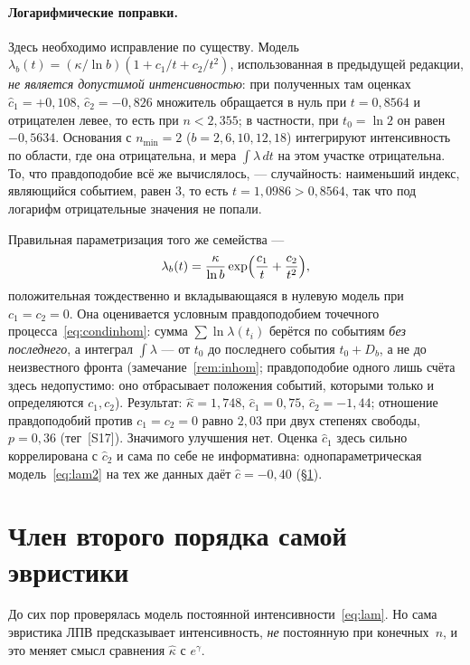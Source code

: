 \documentclass[11pt,a4paper]{article}
\theoremstyle{plain}
\theoremstyle{remark}
\newcommand{\eg}{e^{\gamma}}
\begin{document}
\paragraph{Логарифмические поправки.} Здесь необходимо исправление по существу.
Модель $\lambda_b(t)=(\kappa/\ln b)(1+c_1/t+c_2/t^2)$, использованная в предыдущей
редакции, \emph{не является допустимой интенсивностью}: при полученных там оценках
$\hat c_1=+0{,}108$, $\hat c_2=-0{,}826$ множитель обращается в нуль при
$t=0{,}8564$ и отрицателен левее, то есть при $n<2{,}355$; в частности, при
$t_0=\ln 2$ он равен $-0{,}5634$. Основания с $n_{\min}=2$ ($b=2,6,10,12,18$)
интегрируют интенсивность по области, где она отрицательна, и мера
$\int\lambda\,dt$ на этом участке отрицательна. То, что правдоподобие всё же
вычислялось, --- случайность: наименьший индекс, являющийся событием, равен $3$,
то есть $t=1{,}0986>0{,}8564$, так что под логарифм отрицательные значения не
попали.

Правильная параметризация того же семейства ---
\begin{equation}\label{eq:logcorr}
\lambda_b(t)=\frac{\kappa}{\ln b}\exp\Bigl(\frac{c_1}{t}+\frac{c_2}{t^2}\Bigr),
\end{equation}
положительная тождественно и вкладывающаяся в нулевую модель при $c_1=c_2=0$.
Она оценивается условным правдоподобием точечного
процесса~\eqref{eq:condinhom}: сумма $\sum\ln\lambda(t_i)$ берётся по событиям
\emph{без последнего}, а интеграл $\int\lambda$ --- от $t_0$ до последнего события
$t_0+D_b$, а не до неизвестного фронта (замечание~\ref{rem:inhom}; правдоподобие
одного лишь счёта здесь недопустимо: оно отбрасывает положения событий, которыми
только и определяются $c_1,c_2$). Результат: $\hat\kappa=1{,}748$,
$\hat c_1=0{,}75$, $\hat c_2=-1{,}44$; отношение правдоподобий против $c_1=c_2=0$
равно $2{,}03$ при двух степенях свободы, $p=0{,}36$ (тег~[S17]). Значимого улучшения
нет. Оценка $\hat c_1$ здесь сильно коррелирована с $\hat c_2$ и сама по себе не
информативна: однопараметрическая модель~\eqref{eq:lam2} на тех же данных даёт
$\hat c=-0{,}40$ (\S\ref{sec:second}).

\section{Член второго порядка самой эвристики}\label{sec:second}

До сих пор проверялась модель постоянной интенсивности~\eqref{eq:lam}. Но сама
эвристика ЛПВ предсказывает интенсивность, \emph{не} постоянную при конечных~$n$,
и это меняет смысл сравнения $\hat\kappa$ с $\eg$.
\end{document}
